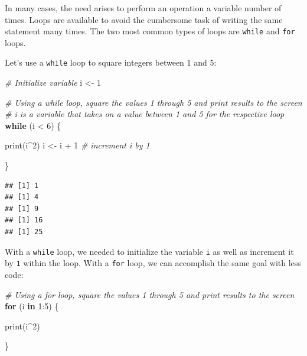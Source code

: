\documentclass[
]{book}
\newenvironment{Shaded}{\begin{snugshade}}{\end{snugshade}}
\newcommand{\CommentTok}[1]{\textcolor[rgb]{0.56,0.35,0.01}{\textit{#1}}}
\newcommand{\ControlFlowTok}[1]{\textcolor[rgb]{0.13,0.29,0.53}{\textbf{#1}}}
\newcommand{\DecValTok}[1]{\textcolor[rgb]{0.00,0.00,0.81}{#1}}
\newcommand{\FunctionTok}[1]{\textcolor[rgb]{0.00,0.00,0.00}{#1}}
\newcommand{\NormalTok}[1]{#1}
\newcommand{\OtherTok}[1]{\textcolor[rgb]{0.56,0.35,0.01}{#1}}
\newcommand{\SpecialCharTok}[1]{\textcolor[rgb]{0.00,0.00,0.00}{#1}}
\begin{document}
In many cases, the need arises to perform an operation a variable number of times. Loops are available to avoid the cumbersome task of writing the same statement many times. The two most common types of loops are \texttt{while} and \texttt{for} loops.

Let's use a \texttt{while} loop to square integers between 1 and 5:

\begin{Shaded}
\begin{Highlighting}[]
\CommentTok{\# Initialize variable}
\NormalTok{i }\OtherTok{\textless{}{-}} \DecValTok{1}

\CommentTok{\# Using a \textquotesingle{}while\textquotesingle{} loop, square the values 1 through 5 and print results to the screen}
\CommentTok{\# \textquotesingle{}i\textquotesingle{} is a variable that takes on a value between 1 and 5 for the respective loop}
\ControlFlowTok{while}\NormalTok{ (i }\SpecialCharTok{\textless{}} \DecValTok{6}\NormalTok{) \{}
  
  \FunctionTok{print}\NormalTok{(i}\SpecialCharTok{\^{}}\DecValTok{2}\NormalTok{) }
\NormalTok{  i }\OtherTok{\textless{}{-}}\NormalTok{ i }\SpecialCharTok{+} \DecValTok{1} \CommentTok{\# increment i by 1}
  
\NormalTok{\}}
\end{Highlighting}
\end{Shaded}

\begin{verbatim}
## [1] 1
## [1] 4
## [1] 9
## [1] 16
## [1] 25
\end{verbatim}

With a \texttt{while} loop, we needed to initialize the variable \texttt{i} as well as increment it by \texttt{1} within the loop. With a \texttt{for} loop, we can accomplish the same goal with less code:

\begin{Shaded}
\begin{Highlighting}[]
\CommentTok{\# Using a \textquotesingle{}for\textquotesingle{} loop, square the values 1 through 5 and print results to the screen}
\ControlFlowTok{for}\NormalTok{ (i }\ControlFlowTok{in} \DecValTok{1}\SpecialCharTok{:}\DecValTok{5}\NormalTok{) \{ }
  
  \FunctionTok{print}\NormalTok{(i}\SpecialCharTok{\^{}}\DecValTok{2}\NormalTok{)}
  
\NormalTok{\}}
\end{Highlighting}
\end{Shaded}
\end{document}
